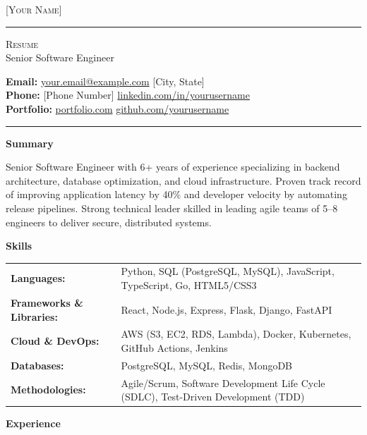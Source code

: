 \documentclass[10pt,a4paper]{article}
\newcommand{\cvsection}[1]{
    \vspace{8pt}
    \begin{center}
        \large\textcolor{sectcol}{\textbf{#1}}
    \end{center}
    \vspace{-4pt}
}
\newcommand{\metasection}[2]{
    \footnotesize{#2} \hspace*{\fill} \footnotesize{#1}\\[2pt]
}
\begin{document}
\color{textColor}

\vspace{-8pt}
\begin{center}
    {\Huge \textsc{[Your Name]}} \textcolor{sectcol}{\rule[-1mm]{1mm}{0.9cm}} \textsc{Resume}\\[4pt]
    \small Senior Software Engineer
\end{center}
\vspace{6pt}

\metasection{[City, State]}{\textbf{Email:} \href{mailto:your.email@example.com}{your.email@example.com}}
\metasection{\href{https://linkedin.com/in/yourusername}{linkedin.com/in/yourusername}}{\textbf{Phone:} [Phone Number]} 
\metasection{\href{https://github.com/yourusername}{github.com/yourusername}}{\textbf{Portfolio:} \href{https://portfolio.com}{portfolio.com}}
\vspace{-2pt}
\textcolor{softcol}{\hrule}
\vspace{6pt}

\cvsection{Summary}
Senior Software Engineer with 6+ years of experience specializing in backend architecture, database optimization, and cloud infrastructure. Proven track record of improving application latency by 40\% and developer velocity by automating release pipelines. Strong technical leader skilled in leading agile teams of 5--8 engineers to deliver secure, distributed systems.
\vspace{4pt}

\cvsection{Skills}
\begin{tabular}{ @{} p{1.8in} @{} p{5.2in} }
    \textbf{Languages:} & Python, SQL (PostgreSQL, MySQL), JavaScript, TypeScript, Go, HTML5/CSS3 \\
    \textbf{Frameworks \& Libraries:} & React, Node.js, Express, Flask, Django, FastAPI \\
    \textbf{Cloud \& DevOps:} & AWS (S3, EC2, RDS, Lambda), Docker, Kubernetes, GitHub Actions, Jenkins \\
    \textbf{Databases:} & PostgreSQL, MySQL, Redis, MongoDB \\
    \textbf{Methodologies:} & Agile/Scrum, Software Development Life Cycle (SDLC), Test-Driven Development (TDD) \\
\end{tabular}
\vspace{4pt}

\cvsection{Experience}
\end{document}
